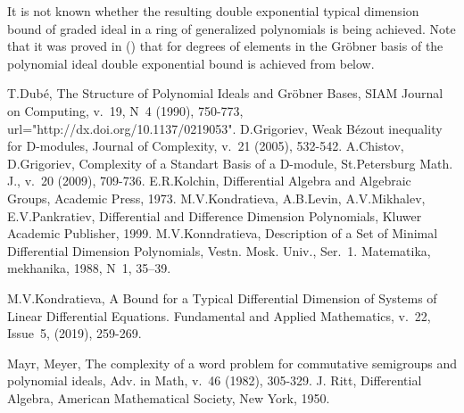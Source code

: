 \documentclass[a4paper,reqno,12pt]{amsart}
\theoremstyle{plain}
\theoremstyle{remark}
\theoremstyle{definition}
\begin{document}
It is not known whether the resulting
double exponential typical dimension bound of
graded ideal in a ring of generalized polynomials is being achieved.
Note that it was proved in (\cite{Mayr}) that for
degrees of
elements in the Gr\"obner basis of the polynomial ideal
double exponential bound is achieved from below.

\begin{thebibliography}{99}
T.Dub\'e, The Structure of Polynomial Ideals and Gr\"obner Bases,
SIAM Journal on Computing, v.~19, N~4 (1990), 750-773,
url="http://dx.doi.org/10.1137/0219053".
D.Grigoriev,
Weak B\'ezout inequality for D-modules, Journal of Complexity, v.~21 (2005),
532-542.
A.Chistov, D.Grigoriev,
Complexity of a Standart Basis of a D-module, St.Petersburg Math. J., 
v.~20 (2009), 709-736.
E.R.Kolchin,
Differential Algebra and Algebraic Groups,
Academic Press, 1973.
M.V.Kondratieva, A.B.Levin, A.V.Mikhalev, E.V.Pankratiev,
 Differential and Difference Dimension Polynomials,
 Kluwer Academic Publisher, 1999.
M.V.Konndratieva, Description of a Set of Minimal
Differential Dimension Polynomials, Vestn. Mosk.
Univ., Ser.~1. Matematika, mekhanika, 1988, N~1,
35–39.

M.V.Kondratieva,
A Bound for a Typical Differential Dimension 
of Systems of Linear Differential Equations.
Fundamental and Applied Mathematics,
v.~22, Issue~5, (2019), 259-269.

Mayr, Meyer, The complexity of a word problem for commutative semigroups and polynomial ideals, Adv. in Math, 
v.~46 (1982),  305-329.
J. Ritt, Differential Algebra, American Mathematical Society, 
New York, 1950.
\end{thebibliography}
\end{document}
